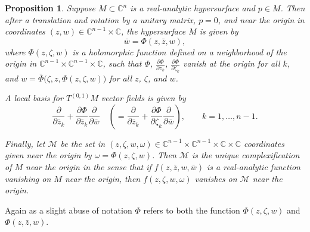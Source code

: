 \documentclass[12pt,openany]{book}
\newcommand{\C}{{\mathbb{C}}}
\newcommand{\sM}{{\mathscr{M}}}
\theoremstyle{plain}
\newtheorem{prop}[thm]{Proposition}
\theoremstyle{remark}
\theoremstyle{definition}
\theoremstyle{exercise}
\theoremstyle{example}
\begin{document}
\begin{prop} \label{prop:complexificationofrasurface}
Suppose $M \subset \C^n$ is a real-analytic hypersurface and $p \in M$.
Then after a translation and rotation by a unitary matrix, $p=0$, and near
the origin in coordinates $(z,w) \in \C^{n-1} \times \C$,
the hypersurface $M$ is given by
\begin{equation*}
\bar{w} = \Phi(z,\bar{z},w) ,
\end{equation*}
where $\Phi(z,\zeta,w)$ is a holomorphic function defined on a neighborhood of the origin
in $\C^{n-1} \times \C^{n-1} \times \C$,
such that
$\Phi$,
$\frac{\partial \Phi}{\partial z_k}$,
$\frac{\partial \Phi}{\partial \zeta_k}$
vanish at the origin for all $k$,
and $w = \bar{\Phi}\bigl(\zeta,z,\Phi(z,\zeta,w)\bigr)$
for all $z$, $\zeta$, and $w$.

A local basis for $T^{(0,1)} M$ vector fields is given by
\begin{equation*}
\frac{\partial}{\partial \bar{z}_k}
+\frac{\partial \Phi}{\partial \bar{z}_k} \frac{\partial}{\partial \bar{w}}
\quad
\left(
=
\frac{\partial}{\partial \bar{z}_k}
+\frac{\partial \Phi}{\partial \zeta_k} \frac{\partial}{\partial \bar{w}}
\right)
,
\qquad k=1,\ldots,n-1.
\end{equation*}

Finally, let $\sM$ be the set in
$(z,\zeta,w,\omega) \in \C^{n-1} \times \C^{n-1} \times \C \times \C$
coordinates given near the origin
by $\omega = \Phi(z,\zeta,w)$.
Then $\sM$ is the unique \emph{complexification}
of $M$%
near the origin in the sense that if $f(z,\bar{z},w,\bar{w})$
is a real-analytic function vanishing on $M$ near the origin, then
$f(z,\zeta,w,\omega)$ vanishes on $\sM$ near the origin.
\end{prop}

Again as a slight abuse of notation $\Phi$ refers to both the function
$\Phi(z,\zeta,w)$ and $\Phi(z,\bar{z},w)$.
\end{document}
